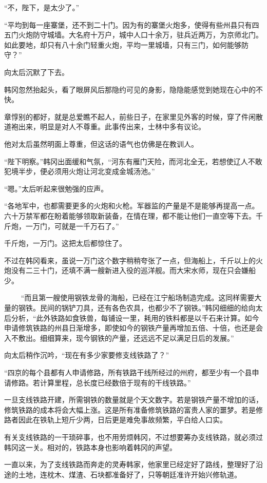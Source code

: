 “不，陛下，是太少了。”

“平均到每一座寨堡，还不到二十门。因为有的寨堡火炮多，使得有些州县只有四五门火炮防守城墙。大名府十万户，城中人口十余万，驻兵近两万，为京师北门。如此要地，却只有八十余门轻重火炮，平均一里城墙，只有三门，如何能够防守？”

向太后沉默了下去。

韩冈忽然抬起头，看了眼屏风后那隐约可见的身影，隐隐能感觉到她现在心中的不快。

章惇别的都好，就是总爱瞧不起人，前些日子，在家里见外客的时候，穿了件闲散道袍出来，明显是对人不尊重。此事传出来，士林中多有议论。

他对太后虽然明面上尊重，但这话的语气也仿佛是在教训人。

“陛下明察。”韩冈出面缓和气氛，“河东有雁门天险，而河北全无，若想使辽人不敢犯境半步，便必须用火炮让河北变成金城汤池。”

“嗯。”太后听起来很勉强的应声。

“各地军中，也都需要更多的火炮和火枪。军器监的产量是不是能够再提高一点。六十万禁军都在盼着能够领取新装备，在情在理，都不能让他们一直空等下去。千斤炮，一万门，可就是一千万石了。”

千斤炮，一万门。这把太后都惊住了。

不过在韩冈看来，虽说一万门这个数字稍稍夸张了一点，但海船上，千斤以上的火炮没有二三十门，还填不满一艘新进入役的巡洋舰。而大宋水师，现在只会嫌船少。

　
　“而且第一艘使用钢铁龙骨的海船，已经在江宁船场制造完成。这同样需要大量的钢铁。民间的锅铲刀具，还有各色农具，也都少不了钢铁。”韩冈细细的给向太
后分析，“此外铁路如食铁兽，每铺设一里，耗用的铁料都是以千石来计算。如今申请修筑铁路的州县日渐增多，即使如今的钢铁产量再增加五倍、十倍，也还是会
入不敷出。细细算来，现今钢铁的产量，还远远不足以满足日后的发展。”

向太后稍作沉吟，“现在有多少家要修支线铁路了？”

“四京的每个县都有人申请修路，所有铁路干线所经过的州府，都至少有一个县申请修路。若计算里程，总长度已经数倍于现有的干线铁路。”

一旦支线铁路开建，所需钢铁的数量就是个天文数字。若是钢铁产量不增加的话，修筑铁路的成本将会大幅上涨。这是所有准备修筑铁路的富贵人家的噩梦。若是修路者因此在铁轨上短斤少两，日后更是难免事故频繁，平白给人口实。

有关支线铁路的一干琐碎事，也不用劳烦韩冈，不过想要筹办支线铁路，就必须过韩冈这一关。相对的，铁路本身也影响着韩冈的声望。

一直以来，为了支线铁路而奔走的灵寿韩家，他家里已经定好了路线，整理好了沿途的土地，连枕木、煤渣、石块都准备好了，只等朝廷准许开始兴修轨道。

